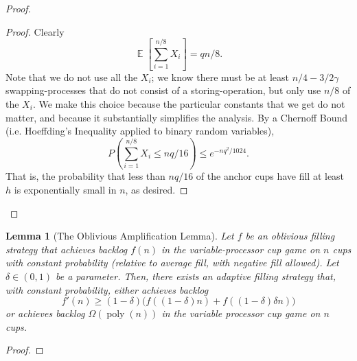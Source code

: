 \documentclass[twocolumn]{article}[10pt]
\DeclareMathOperator{\E}{\mathbb{E}}
\DeclareMathOperator{\poly}{\text{poly}}
\newtheorem{lemma}{Lemma}
\begin{document}
\begin{proof}
\begin{proof}
  Clearly $$\E\left[\sum_{i=1}^{n/8} X_i\right] = qn/8.$$ Note that we do not
  use all the $X_i$; we know there must be at least $n/4 - 3/2 \gamma$
  swapping-processes that do not consist of a storing-operation, but only use
  $n/8$ of the $X_i$. We make this choice because the particular constants that
  we get do not matter, and because it substantially simplifies the analysis.
  By a Chernoff Bound (i.e. Hoeffding's Inequality applied to binary random variables),
  $$P\left(\sum_{i=1}^{n/8} X_i\le nq/16\right) \le e^{-nq^2/1024}.$$ That is, the
  probability that less than $nq/16$ of the anchor cups have fill at least $h$ is
  exponentially small in $n$, as desired.

\end{proof}
  
\end{proof}

\begin{lemma}[The Oblivious Amplification Lemma]
   \label{lem:obliviousAmplification}
  Let $f$ be an oblivious filling strategy that achieves backlog $f(n)$ in the
  variable-processor cup game on $n$ cups with constant probability (relative
  to average fill, with negative fill allowed). Let $\delta \in (0,1)$ be a
  parameter. Then, there exists an adaptive filling strategy that, with
  constant probability, either achieves backlog $$f'(n) \ge
  (1-\delta)\Big(f((1-\delta)n) + f((1-\delta)\delta n)\Big)$$ or achieves
  backlog $\Omega(\poly(n))$ in the variable processor cup game on $n$
  cups.
\end{lemma}
\begin{proof}
  
\end{proof}
\end{document}
